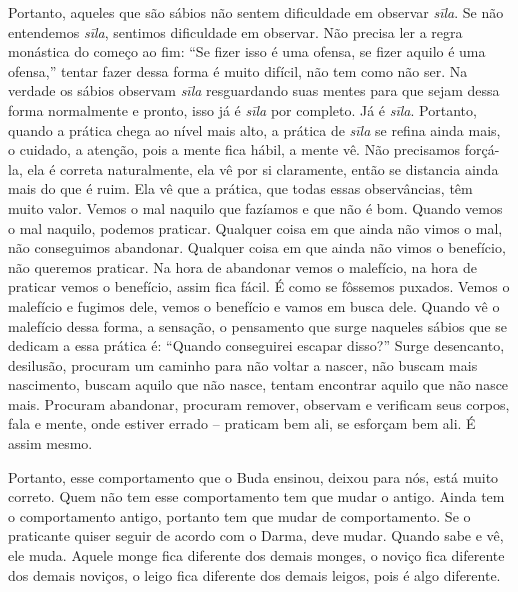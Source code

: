 Portanto, aqueles que são sábios não sentem dificuldade em observar
\textit{sīla}. Se não entendemos \textit{sīla}, sentimos
dificuldade em observar. Não precisa ler a regra monástica do começo ao
fim: “Se fizer isso é uma ofensa, se fizer aquilo é uma ofensa,” tentar
fazer dessa forma é muito difícil, não tem como não ser. Na verdade os
sábios observam \textit{sīla} resguardando suas mentes para que
sejam dessa forma normalmente e pronto, isso já é \textit{sīla} por
completo. Já é \textit{sīla}. Portanto, quando a prática chega ao
nível mais alto, a prática de \textit{sīla} se refina ainda mais, o
cuidado, a atenção, pois a mente fica hábil, a mente vê. Não precisamos
forçá-la, ela é correta naturalmente, ela vê por si claramente, então
se distancia ainda mais do que é ruim. Ela vê que a prática, que todas
essas observâncias, têm muito valor. Vemos o mal naquilo que fazíamos e
que não é bom. Quando vemos o mal naquilo, podemos praticar. Qualquer
coisa em que ainda não vimos o mal, não conseguimos abandonar. Qualquer
coisa em que ainda não vimos o benefício, não queremos praticar. Na
hora de abandonar vemos o malefício, na hora de praticar vemos o
benefício, assim fica fácil. É como se fôssemos puxados. Vemos o
malefício e fugimos dele, vemos o benefício e vamos em busca dele.
Quando vê o malefício dessa forma, a sensação, o pensamento que surge
naqueles sábios que se dedicam a essa prática é: “Quando conseguirei
escapar disso?” Surge desencanto, desilusão, procuram um caminho para
não voltar a nascer, não buscam mais nascimento, buscam aquilo que não
nasce, tentam encontrar aquilo que não nasce mais. Procuram abandonar,
procuram remover, observam e verificam seus corpos, fala e mente, onde
estiver errado – praticam bem ali, se esforçam bem ali. É assim mesmo. 

Portanto, esse comportamento que o Buda ensinou, deixou para nós,
está muito correto. Quem não tem esse comportamento tem que mudar o
antigo. Ainda tem o comportamento antigo, portanto tem que mudar de
comportamento. Se o praticante quiser seguir de acordo com o Darma,
deve mudar. Quando sabe e vê, ele muda. Aquele monge fica diferente dos
demais monges, o noviço fica diferente dos demais noviços, o leigo fica
diferente dos demais leigos, pois é algo diferente. 

